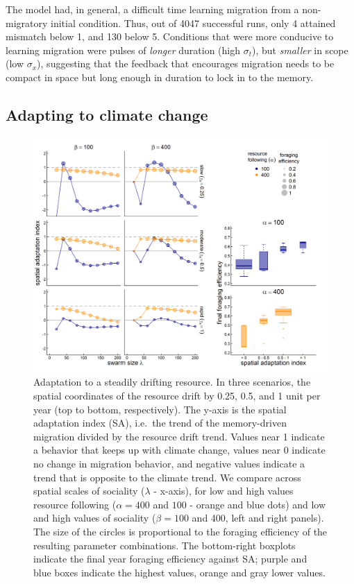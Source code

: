 \documentclass[utf8]{frontiersSCNS} %
\begin{document}
The model had, in general, a difficult time learning migration from a non-migratory initial condition. Thus, out of 4047 successful runs, only 4 attained mismatch below 1, and 130 below 5. Conditions that were more conducive to learning migration were pulses of \emph{longer} duration (high $\sigma_t$), but \emph{smaller} in scope (low $\sigma_x$), suggesting that the feedback that encourages migration needs to be compact in space but long enough in duration to lock in to the memory.

\subsection{Adapting to climate change}

\begin{figure}
	\includegraphics[width = \textwidth]{figures/SpatialClimateChange.png}
	
	\caption{\label{fig_adaptationclimate} Adaptation to a steadily drifting resource. In three scenarios, the spatial coordinates of the resource drift by 0.25, 0.5, and 1 unit per year (top to bottom, respectively). The y-axis is the spatial adaptation index (SA), i.e.~the trend of the memory-driven migration divided by the resource drift trend. Values near 1 indicate a behavior that keeps up with climate change, values near 0 indicate no change in migration behavior, and negative values indicate a trend that is opposite to the climate trend. We compare across spatial scales of sociality ($\lambda$ - x-axis), for low and high values resource following ($\alpha = 400$ and $100$ - orange and blue dots) and low and high values of sociality ($\beta = 100$ and 400, left and right panels). The size of the circles is proportional to the foraging efficiency of the resulting parameter combinations. The bottom-right boxplots indicate the final year foraging efficiency against SA; purple and blue boxes indicate the highest values, orange and gray lower values.}
\end{figure}
\end{document}
